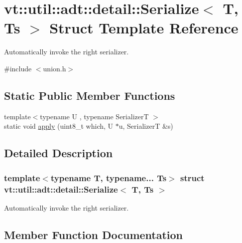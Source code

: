 \hypertarget{structvt_1_1util_1_1adt_1_1detail_1_1_serialize}{}\section{vt\+:\+:util\+:\+:adt\+:\+:detail\+:\+:Serialize$<$ T, Ts $>$ Struct Template Reference}
\label{structvt_1_1util_1_1adt_1_1detail_1_1_serialize}


Automatically invoke the right serializer.  




{\ttfamily \#include $<$union.\+h$>$}

\subsection*{Static Public Member Functions}
\begin{DoxyCompactItemize}
\item 
{\footnotesize template$<$typename U , typename SerializerT $>$ }\\static void \hyperlink{structvt_1_1util_1_1adt_1_1detail_1_1_serialize_a8bfd009de6faffcfeec280b35e15e75e}{apply} (uint8\+\_\+t which, U $\ast$u, SerializerT \&s)
\end{DoxyCompactItemize}


\subsection{Detailed Description}
\subsubsection*{template$<$typename T, typename... Ts$>$\newline
struct vt\+::util\+::adt\+::detail\+::\+Serialize$<$ T, Ts $>$}

Automatically invoke the right serializer. 

\subsection{Member Function Documentation}
\mbox{\label{structvt_1_1util_1_1adt_1_1detail_1_1_serialize_a8bfd009de6faffcfeec280b35e15e75e}} 
